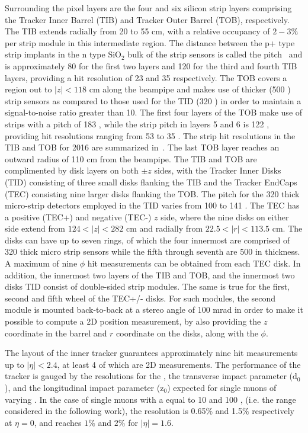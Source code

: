 Surrounding the pixel layers are the four and six silicon strip layers comprising the Tracker Inner Barrel (TIB) and Tracker Outer Barrel (TOB), respectively. The TIB extends radially from 20 to 55 cm, with a relative occupancy of $2-3\%$ per strip module in this intermediate region. The distance between the p+ type strip implants in the n type $\textrm{SiO}_{2}$ bulk of the strip sensors is called the pitch~\cite{Borrello:2003uza} and is approximately 80 \mum for the first two layers and 120 \mum for the third and fourth TIB layers, providing a hit resolution of 23 \mum and 35 \mum respectively. The TOB covers a region out to $|z|<118$ cm along the beampipe and makes use of thicker (500 \mum) strip sensors as compared to those used for the TID (320 \mum) in order to maintain a signal-to-noise ratio greater than 10. The first four layers of the TOB make use of strips with a pitch of 183 \mum, while the strip pitch in layers 5 and 6 is 122 \mum, providing hit resolutions ranging from 53 \mum to 35 \mum. The strip hit resolutions in the TIB and TOB for 2016 are summarized in~. The last TOB layer reaches an outward radius of 110 cm from the beampipe. The TIB and TOB are complimented by disk layers on both $\pm z$ sides, with the Tracker Inner Disks (TID) consisting of three small disks flanking the TIB and the Tracker EndCaps (TEC) consisting nine larger disks flanking the TOB. The pitch for the 320 \mum thick micro-strip detectors employed in the TID varies from 100 \mum to 141 \mum. The TEC has a positive (TEC+) and negative (TEC-) $z$ side, where the nine disks on either side extend from $124 < |z| < 282$ cm and radially from $22.5 < |r| < 113.5$ cm. The disks can have up to seven rings, of which the four innermost are comprised of 320 \mum thick micro strip sensors while the fifth through seventh are 500 \mum in thickness. A maximum of nine $\phi$ hit measurements can be obtained from each TEC disk. In addition, the innermost two layers of the TIB and TOB, and the innermost two disks TID consist of double-sided strip modules. The same is true for the first, second and fifth wheel of the TEC+/- disks. For such modules, the second module is mounted back-to-back at a stereo angle of 100 mrad in order to make it possible to compute a 2D position measurement, by also providing the $z$ coordinate in the barrel and $r$ coordinate on the disks, along with the $\phi$.

The layout of the inner tracker guarantees approximately nine hit measurements up to $|\eta| < 2.4$, at least 4 of which are 2D measurements. The performance of the tracker is gauged by the resolutions for the \pt, the transverse impact parameter ($\textrm{d}_0$), and the longitudinal impact parameter ($\textrm{z}_0$) expected for single muons of varying \pt. In the case of single muons with a \pt equal to 10 and 100 \GeV, (i.e. the range considered in the following work), the \pt resolution is 0.65$\%$ and 1.5$\%$ respectively at $\eta=0$, and reaches $1\%$ and $2\%$ for $|\eta|=1.6$.


